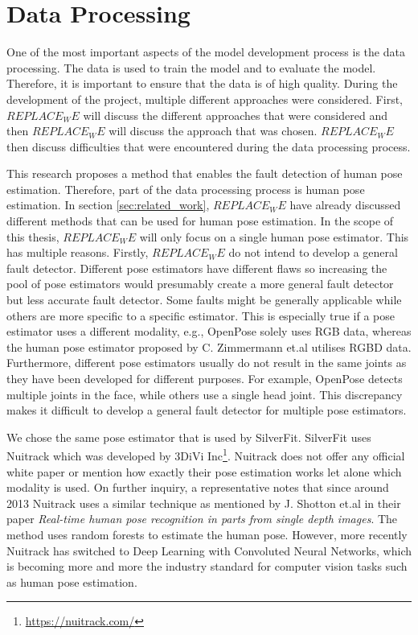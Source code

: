 \chapter{Data Processing}
\label{sec:data_processing}

One of the most important aspects of the model development process is the data processing. The data is used to train the model and to evaluate the model. Therefore, it is important to ensure that the data is of high quality. During the development of the project, multiple different approaches were considered. First, $REPLACE_WE$ will discuss the different approaches that were considered and then $REPLACE_WE$ will discuss the approach that was chosen. $REPLACE_WE$ then discuss difficulties that were encountered during the data processing process.

This research proposes a method that enables the fault detection of human pose estimation. Therefore, part of the data processing process is human pose estimation. In section \ref{sec:related_work}, $REPLACE_WE$ have already discussed different methods that can be used for human pose estimation. In the scope of this thesis, $REPLACE_WE$ will only focus on a single human pose estimator. This has multiple reasons. Firstly, $REPLACE_WE$ do not intend to develop a general fault detector. Different pose estimators have different flaws so increasing the pool of pose estimators would presumably create a more general fault detector but less accurate fault detector. Some faults might be generally applicable while others are more specific to a specific estimator. This is especially true if a pose estimator uses a different modality, e.g., OpenPose solely uses RGB data, whereas the human pose estimator proposed by C. Zimmermann et.al utilises RGBD data\cite{OpenPosePose, RGBDHPEforRoboticTaskLearning}. Furthermore, different pose estimators usually do not result in the same joints as they have been developed for different purposes. For example, OpenPose detects multiple joints in the face, while others use a single head joint. This discrepancy makes it difficult to develop a general fault detector for multiple pose estimators. 

We chose the same pose estimator that is used by SilverFit. SilverFit uses Nuitrack which was developed by 3DiVi Inc\footnote{\url{https://nuitrack.com/}}. Nuitrack does not offer any official white paper or mention how exactly their pose estimation works let alone which modality is used. On further inquiry, a representative notes that since around 2013 Nuitrack uses a similar technique as mentioned by J. Shotton et.al in their paper \textit{Real-time human pose recognition in parts from single depth images}\cite{EarlyRGBDHPE}. The method uses random forests to estimate the human pose. However, more recently Nuitrack has switched to Deep Learning with Convoluted Neural Networks, which is becoming more and more the industry standard for computer vision tasks such as human pose estimation.




